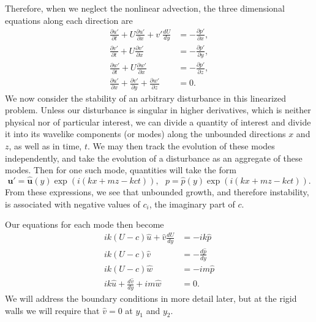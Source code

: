 \documentclass[letterpaper, 11pt, onecolumn]{article}
\newcommand{\pdiff}[2]{\frac{\partial #1}{\partial #2}}
\begin{document}
Therefore, when we neglect the nonlinear advection, the three dimensional equations along each direction are
\begin{subequations}
\begin{align}
\pdiff{u'}{t} + U \pdiff{u'}{x} + v' \frac{dU}{dy} &= - \pdiff{p'}{x}, \\
\pdiff{v'}{t} + U \pdiff{v'}{x} &= - \pdiff{p'}{y}, \\
\pdiff{w'}{t} + U \pdiff{w'}{x} &= - \pdiff{p'}{z}, \\
\pdiff{u'}{x} + \pdiff{v'}{y} + \pdiff{w'}{z} &= 0.
\end{align}
\end{subequations}
We now consider the stability of an arbitrary disturbance in this linearized problem. Unless our disturbance is singular in higher derivatives, which is neither physical nor of particular interest, we can divide a quantity of interest and divide it into its wavelike components (or modes) along the unbounded directions $x$ and $z$, as well as in time, $t$. We may then track the evolution of these modes independently, and take the evolution of a disturbance as an aggregate of these modes. Then for one such mode, quantities will take the form
\begin{equation*}
\bm{u}' = \widehat{\bm{u}}(y) \exp\left(i \left(k x + m z - k c t \right) \right), \ \ \ p = \hat{p}(y) \exp\left(i \left(k x + m z - k c t \right) \right).
\end{equation*}
From these expressions, we see that unbounded growth, and therefore instability, is associated with negative values of $c_i$, the imaginary part of $c$.

Our equations for each mode then become
\begin{subequations}\label{3Deigenproblem}
\begin{align}
i k \left(U - c\right)\hat{u} + \hat{v} \frac{dU}{dy} &= - i k \hat{p} \\
i k \left(U - c\right)\hat{v} &= - \frac{d \hat{p}}{d y} \\
i k \left(U - c\right)\hat{w} &= - i m \hat{p} \\
i k \hat{u} + \frac{d\hat{v}}{d y} + i m \hat{w} &= 0.
\end{align}
\end{subequations}
We will address the boundary conditions in more detail later, but at the rigid walls we will require that $\hat{v} = 0$ at $y_1$ and $y_2$.
\end{document}
